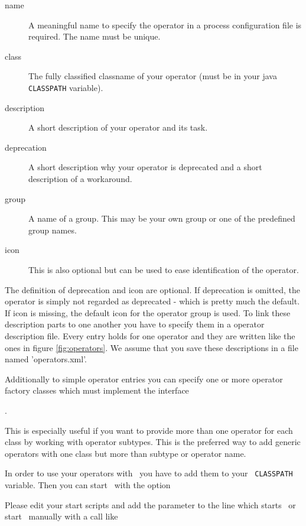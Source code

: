 \begin{description}
  \item[name] A meaningful name to specify the operator in a process 
    configuration file is required. The name must be unique.
  \item[class] The fully classified classname of your operator (must be in your
    java {\tt CLASSPATH} variable).
  \item[description] A short description of your operator and its task.
  \item[deprecation] A short description why your operator is deprecated and a short description of a workaround.
  \item[group] A name of a group. This may be your own group or one of the predefined
  \rapidminer group names.
  \item[icon] This is also optional but can be used to ease identification of
  the operator.
\end{description}

The definition of deprecation and icon are optional. If deprecation is omitted,
the operator is simply not regarded as deprecated - which is pretty much the default.
If icon is missing, the default icon for the operator group is used.
To link these description parts to one another you have to specify them in a
operator description file.
Every entry holds for one
operator and they are written like the ones in figure
\ref{fig:operators}. We assume that you save these descriptions in a file
named 'operators.xml'.


Additionally to simple operator entries you can specify one or more operator
factory classes which must implement the interface
\begin{center}
.
\end{center}
This is especially useful if you want to provide more than one operator for
each class by working with operator subtypes. This is the preferred way to add 
generic operators with one class but more than subtype or operator name.

In order to use your operators with \rapidminer\ you have to add them to your {\tt
  CLASSPATH} variable. Then you can start \rapidminer\ with the option 
\begin{center}
\end{center}
Please edit your start scripts and add the parameter to the line which starts
\rapidminer\ or start \rapidminer\ manually with a call like

